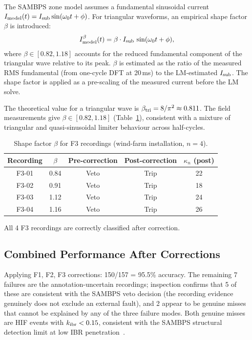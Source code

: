 \documentclass[journal]{IEEEtran}
\newcommand{\kibr}{k_{\rm ibr}}
\newcommand{\kappan}{\kappa_{n}}
\begin{document}
The SAMBPS zone model assumes a fundamental sinusoidal current
$I_{\rm model}(t) = I_{\rm sub}\sin(\omega_0 t + \phi)$.  For
triangular waveforms, an empirical shape factor $\beta$ is introduced:
\begin{equation}
  I_{\rm model}^\beta(t) = \beta \cdot I_{\rm sub}\,\sin(\omega_0 t + \phi),
  \label{eq:beta}
\end{equation}
where $\beta \in [0.82, 1.18]$ accounts for the reduced fundamental
component of the triangular wave relative to its peak.
$\beta$ is estimated as the ratio of the measured RMS fundamental
(from one-cycle DFT at 20\,ms) to the LM-estimated $I_{\rm sub}$.
The shape factor is applied as a pre-scaling of the measured current
before the LM solve.

The theoretical value for a triangular wave is $\beta_{\rm tri} = 8/\pi^2
\approx 0.811$.  The field measurements give $\beta \in [0.82, 1.18]$
(Table~\ref{tab:beta}), consistent with a mixture of triangular and
quasi-sinusoidal limiter behaviour across half-cycles.

\begin{table}[htbp]
  \centering
  \caption{Shape factor $\beta$ for F3 recordings
  (wind-farm installation, $n = 4$).}
  \label{tab:beta}
  \small
  \begin{tabular}{@{}ccccc@{}}
    \toprule
    Recording & $\beta$ & Pre-correction & Post-correction & $\kappan$ (post) \\
    \midrule
    F3-01 & 0.84 & Veto & Trip & 22 \\
    F3-02 & 0.91 & Veto & Trip & 18 \\
    F3-03 & 1.12 & Veto & Trip & 24 \\
    F3-04 & 1.16 & Veto & Trip & 26 \\
    \bottomrule
  \end{tabular}
\end{table}

All 4 F3 recordings are correctly classified after correction.

\subsection{Combined Performance After Corrections}

Applying F1, F2, F3 corrections: 150/157 = 95.5\% accuracy.
The remaining 7 failures are the annotation-uncertain recordings;
inspection confirms that 5 of these are consistent with the SAMBPS
veto decision (the recording evidence genuinely does not exclude an
external fault), and 2 appear to be genuine misses that cannot be
explained by any of the three failure modes.  Both genuine misses
are HIF events with $\kibr < 0.15$, consistent with the SAMBPS
structural detection limit at low IBR penetration~\cite{SAMBP_TR65}.
\end{document}
